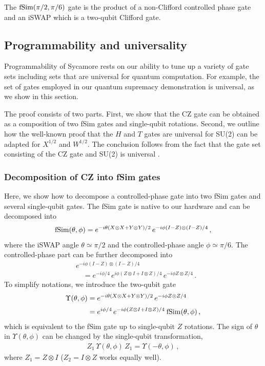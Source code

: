 The $\rm{fSim} (\pi/2, \pi/6)$ gate is the product of a non-Clifford controlled phase gate and an iSWAP which is a two-qubit Clifford gate.

\subsection{Programmability and universality}

Programmability of Sycamore rests on our ability to tune up a variety of gate sets including sets that are universal for quantum computation. For example, the set of gates employed in our quantum supremacy demonstration is universal, as we show in this section.

The proof consists of two parts. First, we show that the {\rm CZ} gate can be obtained as a composition of two fSim gates and single-qubit rotations. Second, we outline how the well-known proof that the $H$ and $T$ gates are universal for {\rm SU(2)} \cite{Boykin1999OnUniversal} can be adapted for $X^{1/2}$ and $W^{1/2}$. The conclusion follows from the fact that the gate set consisting of the {\rm CZ} gate and {\rm SU(2)} is universal \cite{DiVincenzo1995Twobit}.

\subsubsection{Decomposition of {\rm CZ} into {\rm fSim} gates}

Here, we show how to decompose a controlled-phase gate into two {\rm fSim} gates and several single-qubit gates.  The {\rm fSim} gate is native to our hardware and can be decomposed into
\begin{align}\label{cz_to_syc:eq:Sycamore_a}
    {\rm fSim}(\theta, \phi) = e^{-i\theta(X\otimes X + Y\otimes Y)/2}\, e^{-i\phi(I-Z)\otimes (I-Z)/4}\,,
\end{align}
where the iSWAP angle $\theta \simeq \pi/2$ and the controlled-phase angle $\phi \simeq \pi/6$. The controlled-phase part can be further decomposed into
\begin{align}
&e^{-i\phi(I-Z)\otimes (I-Z)/4}\nonumber\\
&\quad = e^{-i\phi/4}\, e^{i\phi (Z\otimes I + I\otimes Z)/4}\, e^{-i\phi Z\otimes Z/4}\,.
\end{align}
To simplify notations, we introduce the two-qubit gate
\begin{align}\label{cz_to_syc:eq:Sycamore_b}
    \Upsilon(\theta, \phi)&= e^{-i\theta(X\otimes X + Y\otimes Y)/2}\, e^{-i\phi Z\otimes Z/4}\nonumber\\[2pt] 
    &= e^{i\phi/4}\, e^{-i\phi (Z\otimes I + I\otimes Z)/4}\: {\rm fSim}(\theta, \phi)
    \,,
\end{align}
which is equivalent to the {\rm fSim} gate up to single-qubit $Z$ rotations. The sign of $\theta$ in $\Upsilon(\theta, \phi)$ can be changed by the single-qubit transformation,
\begin{align}\label{cz_to_syc:eq:Sycamore_b}
  Z_1\, \Upsilon(\theta, \phi)\, Z_1  = \Upsilon(-\theta, \phi) \,,
\end{align}
where $Z_1 = Z\otimes I$ ($Z_2 = I\otimes Z$ works equally well).  

